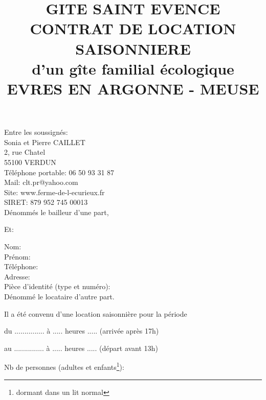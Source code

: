 \documentclass[a4paper,11pt]{article}
\title{GITE SAINT EVENCE\\CONTRAT DE LOCATION SAISONNIERE\\d’un gîte familial écologique\\EVRES EN ARGONNE - MEUSE}
\begin{document}
\date{}
\maketitle

\center Entre les soussignés:\\
\flushleft 
Sonia et Pierre CAILLET\\
2, rue Chatel\\
55100 VERDUN\\                                                                                         
Téléphone portable: 06 50 93 31 87 \\
Mail: clt.pr@yahoo.com\\
Site: www.ferme-de-l-ecurieux.fr\\
SIRET: 879 952 745 00013\\

\vspace{0.5cm}
Dénommés le bailleur d’une part,                            

\center Et:

\flushleft
Nom:\\
Prénom:\\
Téléphone:\\
Adresse:\\
Pièce d'identité (type et numéro):\\

\vspace{0.5cm}
Dénommé le locataire d'autre part.



\flushleft
Il a été convenu d'une location saisonnière pour la période
\vspace{0.5cm}

du   ...............   à .....    heures .....    (arrivée après 17h)
\vspace{0.5cm}

au   ...............   à .....    heures .....   (départ avant 13h)
\vspace{0.5cm}

Nb de personnes (adultes et enfants\footnote{dormant dans un lit normal}): 
\vspace{0.5cm}

\newpage{}




\vspace{0.5cm}
\end{document}
